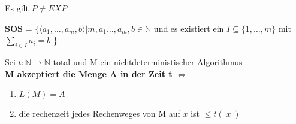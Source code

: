 \documentclass[14pt]{article}
\begin{document}
\begin{eigenschaft}
    Es gilt $P \neq EXP$
\end{eigenschaft}
\begin{definition}
    \textbf{SOS} = $\{ \langle a_1, \dots, a_m, b \rangle |
    m, a_1 \dots,a_m, b \in \mathbb{N}$ und es existiert ein $I 
    \subseteq \{1, \dots, m\}$ mit $\sum_{i \in I} a_i = b$ \}
\end{definition}
\begin{definition}
    Sei $t: \mathbb{N} \rightarrow \mathbb{N}$ total und M ein nichtdeterministischer Algorithmus \\
    \textbf{M akzeptiert die Menge A in der Zeit t} $\Leftrightarrow$
    \begin{enumerate}
        \item $L(M) = A$
        \item die rechenzeit jedes Rechenweges von M auf $x$ ist $\leq t(|x|)$
    \end{enumerate}
\end{definition}
\end{document}
